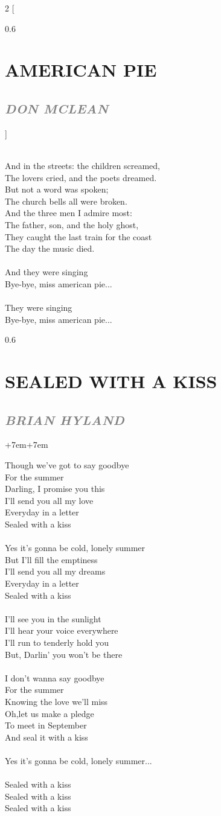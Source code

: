 \documentclass[100pt,a4paper]{report}
\newenvironment{song2}[2]
	{	
    	\begin{multicols*}{2}
		[
			\begin{spacing}{0.6}
				\section*{\LARGE\centering \MakeUppercase{\textbf{{#1}}}}
				\subsection*{\Large\centering \textit{\textcolor{gray}{\MakeUppercase{{#2}}}}}
			\end{spacing}
		]
		\Large
	}
	{
	\end{multicols*}
	\newpage
    }
\newenvironment{song1}[3]
	{
			\begin{spacing}{0.6}
				\section*{\LARGE\centering \MakeUppercase{\textbf{{#1}}}}
				\subsection*{\Large\centering \textit{\textcolor{gray}{\MakeUppercase{{#2}}}}}
			\end{spacing}
			\vspace{0.8cm}
			\begin{adjustwidth}{+7em}{+7em}
			\Large
			
	}
	{
		\end{adjustwidth}
		\newpage
    }
\begin{document}
\begin{song2}{American Pie}{Don McLean}
\\
And in the streets: the children screamed,\\
The lovers cried, and the poets dreamed.\\
But not a word was spoken;\\
The church bells all were broken.\\
And the three men I admire most:\\
The father, son, and the holy ghost,\\
They caught the last train for the coast\\
The day the music died.\\
\\
And they were singing\\
Bye-bye, miss american pie...\\
\\
They were singing\\
Bye-bye, miss american pie...
\end{song2}

\begin{song1}{Sealed with a kiss}{Brian Hyland}
\noindent
Though we've got to say goodbye\\
For the summer\\
Darling, I promise you this\\
I'll send you all my love\\
Everyday in a letter\\
Sealed with a kiss\\
\\
Yes it's gonna be cold, lonely summer\\
But I'll fill the emptiness\\
I'll send you all my dreams\\
Everyday in a letter\\
Sealed with a kiss\\
\\
I'll see you in the sunlight\\
I'll hear your voice everywhere\\
I'll run to tenderly hold you\\
But, Darlin' you won't be there\\
\\
I don't wanna say goodbye\\
For the summer\\
Knowing the love we'll miss\\
Oh,let us make a pledge\\
To meet in September\\
And seal it with a kiss\\
\\
Yes it's gonna be cold, lonely summer...\\
\\
Sealed with a kiss\\
Sealed with a kiss\\
Sealed with a kiss\\
\end{song1}
\end{document}
